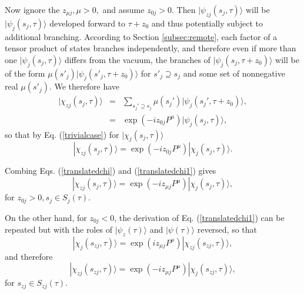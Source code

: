 \documentclass[12pt,amsmath,amssymb,onecolumn]{revtex4-2}
\begin{document}
Now ignore the $z_{\mu j}, \mu > 0, $ and assume $z_{0 j} > 0$.
Then $|\psi_{zj}( s_j, \tau) \rangle $
will be $|\psi_j( s_j, \tau) \rangle $ developed forward to $\tau + z_0$
and thus potentially subject to additional branching.
According to Section \ref{subsec:remote}, each factor of a tensor product of states
branches independently, and therefore even if more than one $|\psi_j( s_j, \tau) \rangle $
differs from the vacuum, 
the branches of
$|\psi_j( s_j, \tau + z_0) \rangle $
will be of the form
$\mu( s'_j) |\psi_j( s'_j, \tau + z_0) \rangle $ for $s'_j \supseteq s_j$
and some set of nonnegative real $\mu( s'_j)$.
We therefore have
\begin{subequations}
  \begin{eqnarray}
    \label{evolvedbranches}
    |\chi_{zj}( s_j, \tau) \rangle  & = &  \sum_{ s_j' \supseteq s_j} \mu( s_j') |\psi_j( s_j', \tau + z_0) \rangle , \\
    \label{evolvedbranches1}
    & = & \exp( -i z_{0 j} P^\mu) |\psi_j(s_j, \tau) \rangle ,
  \end{eqnarray}
\end{subequations}
so that by Eq. (\ref{trivialcase}) for $|\chi_j( s_j, \tau) \rangle $
\begin{equation}
  \label{translatedchi1}
   |\chi_{zj}( s_j, \tau) \rangle  = \exp( -i  z_{0 j} P^\mu) |\chi_j( s_j, \tau) \rangle .
\end{equation}






Combing Eqs. (\ref{translatedchi}) and (\ref{translatedchi1}) gives
\begin{equation}
  \label{translatedchi2}
   |\chi_{zj}( s_j, \tau) \rangle  = \exp( -i z_{\mu j} P^\mu) |\chi_j( s_j, \tau) \rangle ,
\end{equation}
for $z_{0j} > 0, s_j \in S_j( \tau)$. 

On the other hand, for $z_{0 j} < 0$, the derivation of Eq. (\ref{translatedchi1})
can be repeated but with the roles of $|\psi_z( \tau) \rangle $ and $|\psi( \tau) \rangle $ reversed,
so that
\begin{equation}
  \label{translatedchi3}
   |\chi_j( s_{zj}, \tau) \rangle  = \exp( i z_{\mu j} P^\mu) |\chi_{zj}( s_{zj}, \tau) \rangle ,
\end{equation}
and therefore
\begin{equation}
  \label{translatedchi4}
   |\chi_{zj}( s_{zj}, \tau) \rangle  = \exp( -i z_{\mu j} P^\mu) |\chi_j( s_{zj}, \tau) \rangle ,
\end{equation}
for $ s_{zj} \in S_{zj}( \tau)$.
\end{document}
